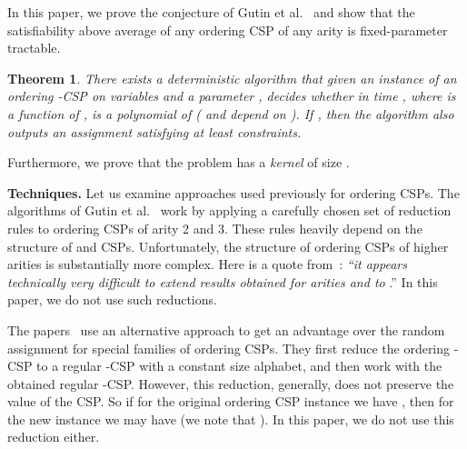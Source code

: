 \documentclass[11pt]{article}
\newtheorem{theorem}{Theorem}
\begin{document}
In this paper, we prove the conjecture of Gutin et al.~\cite{GIMY} and show that the satisfiability above average of any ordering CSP of any arity  is fixed-parameter tractable.
\begin{theorem}\label{thm:main-intro}
There exists a deterministic algorithm that given an instance  of an ordering -CSP on  variables and a parameter , decides whether
 in time , where  is a function of ,  is a polynomial of  ( and  depend on ).
If , then the algorithm also outputs an assignment satisfying at least  constraints.
\end{theorem}
Furthermore, we prove that the problem has a \emph{kernel} of size .


\medskip

\noindent \textbf{Techniques.} Let us examine approaches used previously for ordering CSPs.
The algorithms of Gutin et al.~\cite{GKSY, GIMY, GKMY} work by applying a carefully chosen
set of reduction rules to ordering CSPs of arity 2 and 3. These rules heavily depend on the structure of
 and  CSPs. Unfortunately, the structure of ordering
CSPs of higher arities is substantially more complex. Here is a quote from~\cite{GIMY}: \emph{``it appears technically
very difficult to extend results obtained for arities  and  to }.''
In this paper, we do not use such reductions.

The papers~\cite{CMM, GZ, Mak} use an alternative approach to get an advantage over the random assignment
for special families of ordering CSPs. They first reduce the ordering -CSP to a regular -CSP with a constant size alphabet, and
then work with the obtained regular -CSP. However, this reduction, generally, does not preserve the value of the CSP. So if for the original
ordering CSP instance  we have , then for the new instance  we may
have  (we note that ).
In this paper, we do not use this reduction either.
\end{document}
